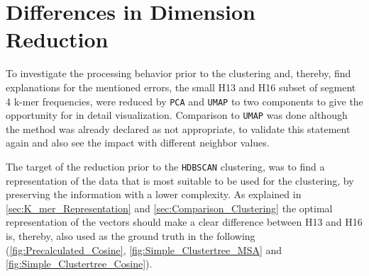\section{Differences in Dimension Reduction} \label{sec:Dimension_Reduction}

To investigate the processing behavior prior to the clustering and, thereby, find explanations for the mentioned errors, the small H13 and H16 subset of segment 4 k-mer frequencies, were reduced by \texttt{PCA} and \texttt{UMAP} to two components to give the opportunity for in detail visualization. Comparison to \texttt{UMAP} was done although the method was already declared as not appropriate, to validate this statement again and also see the impact with different neighbor values. 

\vspace{1em}

The target of the reduction prior to the \texttt{HDBSCAN} clustering, was to find a representation of the data that is most suitable to be used for the clustering, by preserving the information with a lower complexity. As explained in \autoref{sec:K_mer_Representation} and \autoref{sec:Comparison_Clustering} the optimal representation of the vectors should make a clear difference between H13 and H16 is, thereby, also used as the ground truth in the following (\autoref{fig:Precalculated_Cosine}, \autoref{fig:Simple_Clustertree_MSA} and \autoref{fig:Simple_Clustertree_Cosine}).

